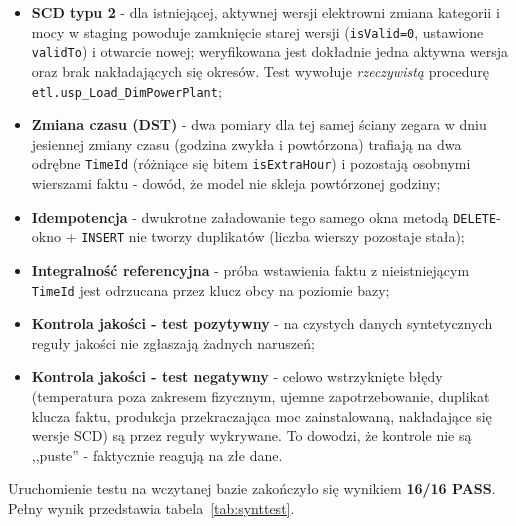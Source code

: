 \documentclass[12pt]{article}
\begin{document}
	\begin{itemize}
		\item \textbf{SCD typu 2} - dla istniejącej, aktywnej wersji elektrowni zmiana kategorii i mocy w staging powoduje zamknięcie starej wersji (\texttt{isValid=0}, ustawione \texttt{validTo}) i otwarcie nowej; weryfikowana jest dokładnie jedna aktywna wersja oraz brak nakładających się okresów. Test wywołuje \emph{rzeczywistą} procedurę \texttt{etl.usp\_Load\_DimPowerPlant};
		\item \textbf{Zmiana czasu (DST)} - dwa pomiary dla tej samej ściany zegara w dniu jesiennej zmiany czasu (godzina zwykła i powtórzona) trafiają na dwa odrębne \texttt{TimeId} (różniące się bitem \texttt{isExtraHour}) i pozostają osobnymi wierszami faktu - dowód, że model nie skleja powtórzonej godziny;
		\item \textbf{Idempotencja} - dwukrotne załadowanie tego samego okna metodą \texttt{DELETE}-okno + \texttt{INSERT} nie tworzy duplikatów (liczba wierszy pozostaje stała);
		\item \textbf{Integralność referencyjna} - próba wstawienia faktu z nieistniejącym \texttt{TimeId} jest odrzucana przez klucz obcy na poziomie bazy;
		\item \textbf{Kontrola jakości - test pozytywny} - na czystych danych syntetycznych reguły jakości nie zgłaszają żadnych naruszeń;
		\item \textbf{Kontrola jakości - test negatywny} - celowo wstrzyknięte błędy (temperatura poza zakresem fizycznym, ujemne zapotrzebowanie, duplikat klucza faktu, produkcja przekraczająca moc zainstalowaną, nakładające się wersje SCD) są przez reguły wykrywane. To dowodzi, że kontrole nie są ,,puste'' - faktycznie reagują na złe dane.
	\end{itemize}

	\noindent Uruchomienie testu na wczytanej bazie zakończyło się wynikiem \textbf{16/16 PASS}. Pełny wynik przedstawia tabela~\ref{tab:synttest}.
\end{document}
